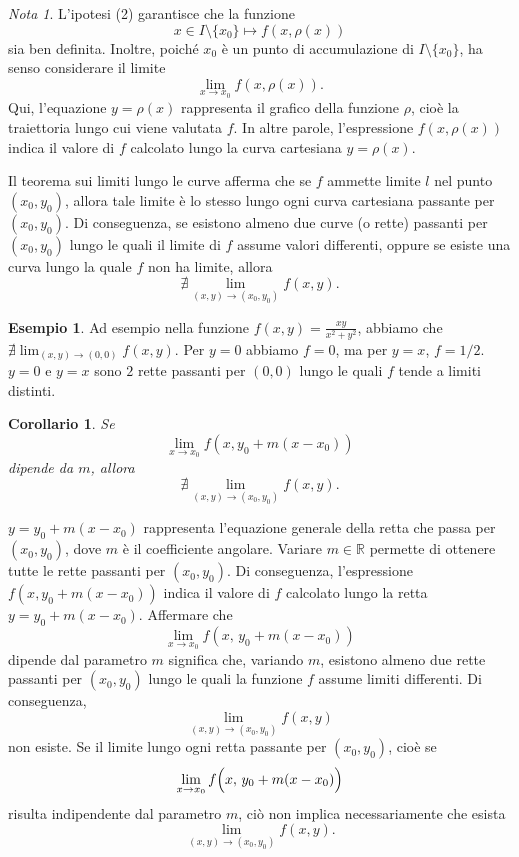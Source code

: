 \documentclass{article}
\theoremstyle{plain}
\newtheorem{cor}{Corollario}
\theoremstyle{definition}
\newtheorem{exmp}{Esempio}[section]
\theoremstyle{remark}
\newtheorem{note}{Nota}
\begin{document}
\vspace{10pt}

\begin{note}
    L'ipotesi (2) garantisce che la funzione
    \[
    x \in I\setminus\{x_0\} \mapsto f(x,\rho(x))
    \]
    sia ben definita. Inoltre, poiché $x_0$ è un punto di accumulazione di $I\setminus\{x_0\}$, ha senso considerare il limite
    \[
    \lim_{x\to x_0} f(x,\rho(x)).
    \]
    Qui, l'equazione $y=\rho(x)$ rappresenta il grafico della funzione $\rho$, cioè la traiettoria lungo cui viene valutata $f$. In altre parole, l'espressione $f(x,\rho(x))$ indica il valore di $f$ calcolato lungo la curva cartesiana $y=\rho(x)$.
    
    Il teorema sui limiti lungo le curve afferma che se $f$ ammette limite $l$ nel punto $(x_0,y_0)$, allora tale limite è lo stesso lungo ogni curva cartesiana passante per $(x_0,y_0)$. Di conseguenza, se esistono almeno due curve (o rette) passanti per $(x_0,y_0)$ lungo le quali il limite di $f$ assume valori differenti, oppure se esiste una curva lungo la quale $f$ non ha limite, allora
    \[
    \nexists \lim_{(x,y)\to (x_0,y_0)} f(x,y).
    \]
\end{note}

\vspace{10pt}

\begin{exmp}
    Ad esempio nella funzione $f(x,y)=\frac{xy}{x^2+y^2}$, abbiamo che $\nexists\lim_{(x,y)\to(0,0)}f(x,y)$.
    Per $y=0$ abbiamo $f=0$, ma per $y=x$, $f=1/2$.
    $y=0$ e $y=x$ sono $2$ rette passanti per $(0,0)$ lungo le quali $f$ tende a limiti distinti.
\end{exmp}

\vspace{10pt}

\begin{bxthm}
\begin{cor}
    Se \[\lim_{x\to x_0}f(x,y_0+m(x-x_0))\] dipende da $m$, allora \[\nexists\lim_{(x,y)\to(x_0,y_0)}f(x,y).\]
\end{cor}
\end{bxthm}

\vspace{10pt}

$y = y_0 + m(x-x_0)$ rappresenta l'equazione generale della retta che passa per $(x_0, y_0)$, dove $m$ è il coefficiente angolare. 
Variare $m\in\mathbb{R}$ permette di ottenere tutte le rette passanti per $(x_0, y_0)$. 
Di conseguenza, l'espressione $f(x, y_0 + m(x-x_0))$ indica il valore di $f$ calcolato lungo la retta 
$y = y_0 + m(x-x_0)$.
Affermare che 
\[
\lim_{x\to x_0} f(x,\,y_0 + m(x-x_0))
\]
dipende dal parametro \( m \) significa che, variando \( m \), esistono almeno due rette passanti per \((x_0,y_0)\) lungo le quali la funzione \( f \) assume limiti differenti. Di conseguenza, 
\[
\lim_{(x,y)\to(x_0,y_0)} f(x,y)
\]
non esiste. Se il limite lungo ogni retta passante per $(x_0,y_0)$,
cioè se 
\[
\lim_{x\to x_0} f\Bigl(x,\,y_0+m(x-x_0)\Bigr)
\]
risulta indipendente dal parametro $m$, ciò non implica necessariamente che esista 
\[
\lim_{(x,y)\to (x_0,y_0)} f(x,y).
\]
\end{document}
